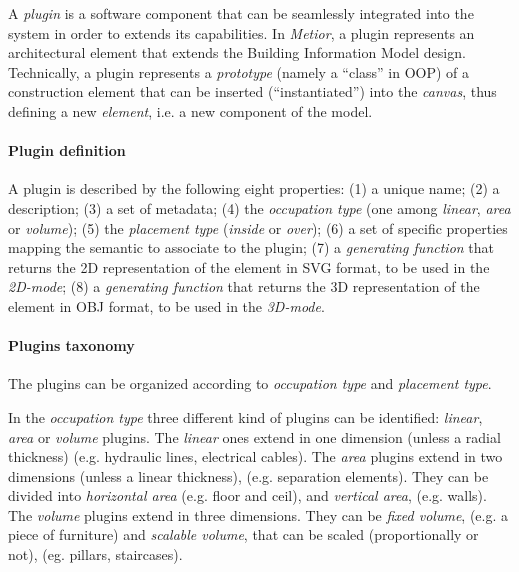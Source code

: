 A \emph{plugin} is a software component that can be seamlessly integrated into the system in order to extends its capabilities.
In \emph{Metior}, a plugin represents an architectural element that extends the Building Information Model design.
Technically, a plugin represents a \emph{prototype} (namely a ``class'' in OOP) of a construction element that can be inserted (``instantiated'') into the \emph{canvas}, thus defining a new \emph{element}, i.e. a new component of the model.

\paragraph{Plugin definition}

\noindent
A plugin is described by the following eight properties: (1) a unique name; (2) a description; (3) a set of metadata; (4) the \emph{occupation type} (one among \emph{linear}, \emph{area} or \emph{volume}); (5) the \emph{placement type} (\emph{inside} or \emph{over}); (6) a set of specific properties mapping the semantic to associate to the plugin; (7) a \emph{generating function} that returns the 2D representation of the element in SVG format, to be used in the \emph{2D-mode}; (8) a \emph{generating function} that returns the 3D representation of the element in OBJ format, to be used in the \emph{3D-mode}.

\paragraph{Plugins taxonomy}
\label{ssec:taxonomy}

\noindent
The plugins can be organized according to \emph{occupation type} and \emph{placement type}.

In the \emph{occupation type} three different kind of plugins can be identified: \emph{linear}, \emph{area} or \emph{volume} plugins.
The \emph{linear} ones extend in one dimension (unless a radial thickness) (e.g. hydraulic lines, electrical cables). The \emph{area} plugins extend in two dimensions (unless a linear thickness), (e.g. separation elements). They can be divided into \emph{horizontal area} (e.g. floor and ceil), and \emph{vertical area}, (e.g. walls). The \emph{volume} plugins extend in three dimensions. They can be \emph{fixed volume}, (e.g. a piece of furniture) and \emph{scalable volume}, that can be scaled (proportionally or not), (eg. pillars, staircases).

